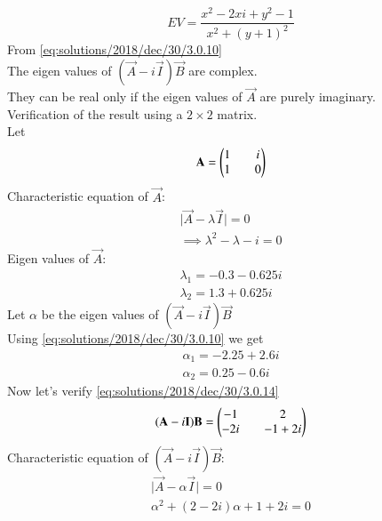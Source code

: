  \begin{equation}\label{eq:solutions/2018/dec/30/3.0.10}
 EV = \frac{x^2-2xi+y^2-1}{x^2+(y+1)^2}
 \end{equation}
 From \eqref{eq:solutions/2018/dec/30/3.0.10}\\
 The eigen values of $(\vec{A}-i\vec{I})\vec{B}$ are complex.\\
 They can be real only if the eigen values of $\vec{A}$ are purely imaginary.\\
 Verification of the result using a $2\times2$ matrix.\\
 Let 
 \begin{equation}\label{eq:solutions/2018/dec/30/3.0.11}
 \mathbf{A} = \begin{pmatrix}1 && i \\ 1 && 0\end{pmatrix}
 \end{equation}
 Characteristic equation of $\vec{A}$:
 \begin{equation}\label{eq:solutions/2018/dec/30/3.0.12}
 \begin{split}
 \vert\vec{A}-\lambda\vec{I}\vert = 0\\
 \implies \lambda^2 - \lambda - i = 0
 \end{split}
 \end{equation}
 Eigen values of $\vec{A}$:
 \begin{equation}\label{eq:solutions/2018/dec/30/3.0.13}
 \begin{split}
 \lambda_1 = -0.3 - 0.625i \\
 \lambda_2 = 1.3 + 0.625i
 \end{split}
 \end{equation}
 Let $\alpha$ be the eigen values of $(\vec{A}-i\vec{I})\vec{B}$ \\
 Using \eqref{eq:solutions/2018/dec/30/3.0.10} we get 
 \begin{equation}\label{eq:solutions/2018/dec/30/3.0.14}
 \begin{split}
 \alpha_1 = -2.25 + 2.6i \\
 \alpha_2 = 0.25 - 0.6i
 \end{split}
 \end{equation}
 Now let's verify \eqref{eq:solutions/2018/dec/30/3.0.14}
 \begin{equation}\label{eq:solutions/2018/dec/30/3.0.15}
 (\mathbf{A}-i\mathbf{I})\mathbf{B} = \begin{pmatrix}-1 && 2 \\ -2i && -1+2i\end{pmatrix}
 \end{equation}
 Characteristic equation of $(\vec{A}-i\vec{I})\vec{B}$:
 \begin{equation}\label{eq:solutions/2018/dec/30/3.0.16}
 \begin{split}
 \vert\vec{A}-\alpha\vec{I}\vert = 0\\
 \alpha^2 + (2-2i)\alpha + 1 + 2i = 0
 \end{split}
 \end{equation}
